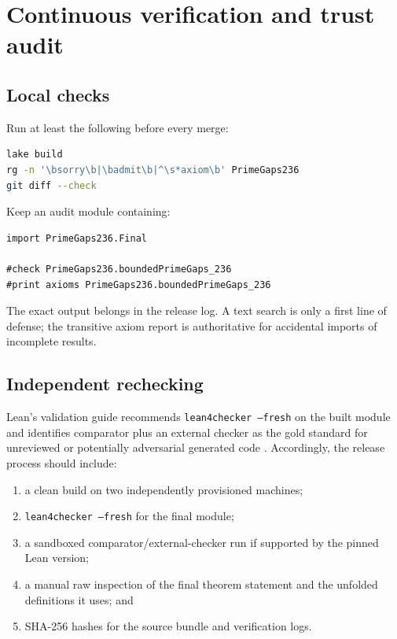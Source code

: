 \documentclass[11pt]{article}
\newcommand{\leanname}[1]{\texttt{#1}}
\begin{document}
\section{Continuous verification and trust audit}

\subsection{Local checks}

Run at least the following before every merge:

\begin{lstlisting}[language=bash]
lake build
rg -n '\bsorry\b|\badmit\b|^\s*axiom\b' PrimeGaps236
git diff --check
\end{lstlisting}

Keep an audit module containing:

\begin{lstlisting}
import PrimeGaps236.Final

#check PrimeGaps236.boundedPrimeGaps_236
#print axioms PrimeGaps236.boundedPrimeGaps_236
\end{lstlisting}

The exact output belongs in the release log.  A text search is only a first
line of defense; the transitive axiom report is authoritative for accidental
imports of incomplete results.

\subsection{Independent rechecking}

Lean's validation guide recommends \leanname{lean4checker --fresh} on the
built module and identifies comparator plus an external checker as the gold
standard for unreviewed or potentially adversarial generated code
\cite{LeanValidation}.  Accordingly, the release process should include:

\begin{enumerate}
\item a clean build on two independently provisioned machines;
\item \leanname{lean4checker --fresh} for the final module;
\item a sandboxed comparator/external-checker run if supported by the pinned
Lean version;
\item a manual raw inspection of the final theorem statement and the unfolded
definitions it uses; and
\item SHA-256 hashes for the source bundle and verification logs.
\end{enumerate}
\end{document}
